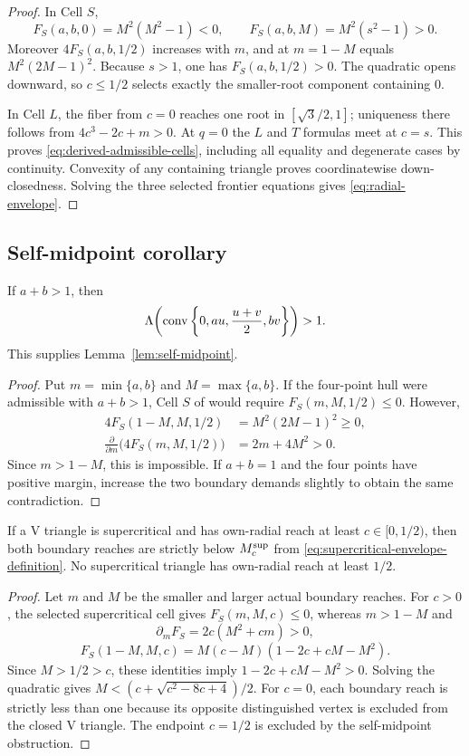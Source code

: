 \begin{proof}
In Cell $S$,
\[
 F_S(a,b,0)=M^2(M^2-1)<0,
 \qquad F_S(a,b,M)=M^2(s^2-1)>0.
\]
Moreover $4F_S(a,b,1/2)$ increases with $m$, and at $m=1-M$ equals
$M^2(2M-1)^2$.  Because $s>1$, one has $F_S(a,b,1/2)>0$.  The quadratic
opens downward, so $c\le1/2$ selects exactly the smaller-root component
containing $0$.

In Cell $L$, the fiber from $c=0$ reaches one root in
$[\sqrt3/2,1]$; uniqueness there follows from
$4c^3-2c+m>0$.  At $q=0$ the $L$ and $T$ formulas meet at $c=s$.
This proves \eqref{eq:derived-admissible-cells}, including all equality and
degenerate cases by continuity.  Convexity of any containing triangle proves
coordinatewise down-closedness.  Solving the three selected frontier
equations gives \eqref{eq:radial-envelope}.
\end{proof}


\subsection{Self-midpoint corollary}

\begin{lemma}
\label{lem:app-self-midpoint-caliper}
If $a+b>1$, then
\[
 \Lambda\!\left(\mathrm{conv}\left\{0,au,\frac{u+v}{2},bv\right\}\right)>1.
\]
This supplies Lemma~\ref{lem:self-midpoint}.
\end{lemma}

\begin{proof}
Put $m=\min\{a,b\}$ and $M=\max\{a,b\}$. If the four-point hull
were admissible with $a+b>1$, Cell $S$ of
 would require $F_S(m,M,1/2)\le0$.
However,
\[
\begin{aligned}
 4F_S(1-M,M,1/2)&=M^2(2M-1)^2\ge0,\\
 \frac{\partial}{\partial m}\bigl(4F_S(m,M,1/2)\bigr)&=2m+4M^2>0.
\end{aligned}
\]
Since $m>1-M$, this is impossible. If $a+b=1$ and the four points
have positive margin, increase the two boundary demands slightly to
obtain the same contradiction.
\end{proof}

\begin{lemma}
\label{lem:strict-supercritical-envelope}
If a V triangle is supercritical and has own-radial reach at least
$c\in[0,1/2)$, then both boundary reaches are strictly below
$M_c^{\rm sup}$ from \eqref{eq:supercritical-envelope-definition}.
No supercritical triangle has own-radial reach at least $1/2$.
\end{lemma}
\begin{proof}
Let $m$ and $M$ be the smaller and larger actual boundary reaches.
For $c>0$, the selected supercritical cell gives $F_S(m,M,c)\le0$,
whereas $m>1-M$ and
\[
 \partial_m F_S=2c(M^2+cm)>0,
\]
\[
 F_S(1-M,M,c)=M(c-M)(1-2c+cM-M^2).
\]
Since $M>1/2>c$, these identities imply
$1-2c+cM-M^2>0$. Solving the quadratic gives
$M<(c+\sqrt{c^2-8c+4})/2$.
For $c=0$, each boundary reach is strictly less than one because its
opposite distinguished vertex is excluded from the closed V triangle.
The endpoint $c=1/2$ is excluded by the self-midpoint obstruction.
\end{proof}

